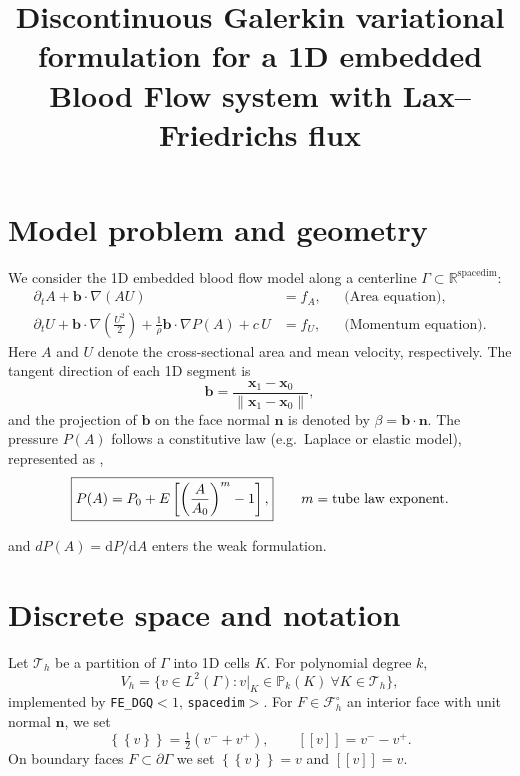 \documentclass[11pt]{article}
\title{Discontinuous Galerkin variational formulation for a 1D embedded Blood Flow system with Lax--Friedrichs flux}
\author{}
\date{}
\newcommand{\R}{\mathbb{R}}
\newcommand{\avg}[1]{\left\{\!\!\left\{#1\right\}\!\!\right\}}
\newcommand{\jump}[1]{\left[\!\left[#1\right]\!\right]}
\newcommand{\Vh}{V_h}
\newcommand{\Th}{\mathcal{T}_h}
\newcommand{\Fh}{\mathcal{F}_h}
\begin{document}
\maketitle

\section{Model problem and geometry}
We consider the 1D embedded blood flow model along a centerline
$\Gamma \subset \R^{\text{spacedim}}$:
\begin{align}
  \partial_t A + \bm b\!\cdot\!\nabla (A U) &= f_A,
  && \text{(Area equation)}, \label{eq:area-eq}\\
  \partial_t U + \bm b\!\cdot\!\nabla\!\left(\frac{U^2}{2}\right)
  + \frac{1}{\rho}\bm b\!\cdot\!\nabla P(A)
  + c\,U &= f_U,
  && \text{(Momentum equation)}. \label{eq:momentum-eq}
\end{align}
Here $A$ and $U$ denote the cross-sectional area and mean velocity, respectively.
The tangent direction of each 1D segment is
\[
  \bm b = \frac{\bm x_1 - \bm x_0}{\lVert \bm x_1 - \bm x_0\rVert},
\]
and the projection of $\bm b$ on the face normal $\bm n$ is denoted by
$\beta = \bm b\!\cdot\!\bm n$.
The pressure $P(A)$ follows a constitutive law (e.g.\ Laplace or elastic model), represented as ,
\begin{equation}
\boxed{%
P(A) = P_0 + E \left[\left(\frac{A}{A_0}\right)^{m} - 1\right],
}
\qquad m = \text{tube law exponent.}
\end{equation}

and $dP(A)=\mathrm{d}P/\mathrm{d}A$ enters the weak formulation.

\section{Discrete space and notation}
Let $\Th$ be a partition of $\Gamma$ into 1D cells $K$. For polynomial degree $k$,
\[
  \Vh = \{ v\in L^2(\Gamma): v|_K \in \mathbb P_k(K)\ \forall K\in\Th \},
\]
implemented by \texttt{FE\_DGQ$<1,\,$spacedim$>$}.  
For $F\in\Fh^\circ$ an interior face with unit normal $\bm n$, we set
\[
  \avg{v}=\tfrac12(v^-+v^+), \qquad \jump{v}=v^- - v^+.
\]
On boundary faces $F\subset\partial\Gamma$ we set $\avg{v}=v$ and $\jump{v}=v$.

 
\end{document}
